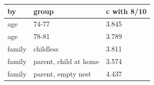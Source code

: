 \begingroup\small
\setlength{\tabcolsep}{3pt}
\renewcommand{\arraystretch}{1.04}
\begin{tabularx}{\linewidth}{XXX}
\toprule
by & group & c with 8/10 \\
\midrule
age & 74-77 & 3.845 \\
age & 78-81 & 3.789 \\
family & childless & 3.811 \\
family & parent, child at home & 3.574 \\
family & parent, empty nest & 4.437 \\
\bottomrule
\end{tabularx}
\endgroup
